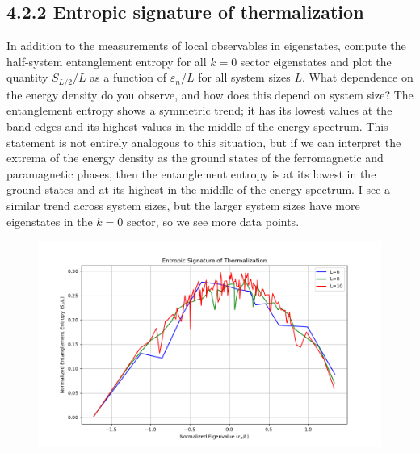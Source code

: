 \documentclass[12pt]{article}
\begin{document}
\subsection*{4.2.2 Entropic signature of thermalization}
In addition to the measurements of local observables in eigenstates, compute the half-system entanglement entropy for all $k=0$ sector eigenstates and plot the quantity $S_{L / 2} / L$ as a function of $\varepsilon_{n} / L$ for all system sizes $L$. What dependence on the energy density do you observe, and how does this depend on system size?
\newpage
The entanglement entropy shows a symmetric trend; it has its lowest values at the band edges and its highest values in the middle of the energy spectrum. This statement is not entirely analogous to this situation, but if we can interpret the extrema of the energy density as the ground states of the ferromagnetic and paramagnetic phases, then the entanglement entropy is at its lowest in the ground states and at its highest in the middle of the energy spectrum. I see a similar trend across system sizes, but the larger system sizes have more eigenstates in the $k=0$ sector, so we see more data points.
\begin{figure}
\centering
\includegraphics[width=\textwidth]{p4_2_2_entropic_signature.png}
\end{figure}
\end{document}
